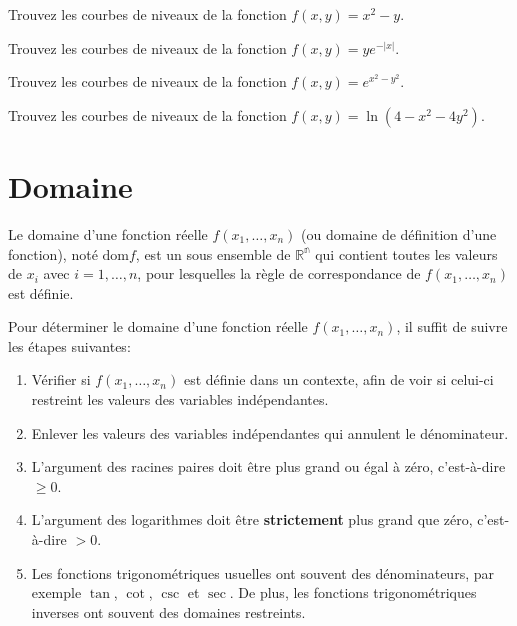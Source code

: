 \documentclass[]{book}
\providecommand{\tightlist}{%
  \setlength{\itemsep}{0pt}\setlength{\parskip}{0pt}}
\theoremstyle{definition}
\theoremstyle{definition}
\theoremstyle{definition}
\theoremstyle{remark}
\let\BeginKnitrBlock\begin \let\EndKnitrBlock\end
\begin{document}
\BeginKnitrBlock{example}
\protect\hypertarget{exm:unnamed-chunk-128}{}{\label{exm:unnamed-chunk-128}
}Trouvez les courbes de niveaux de la fonction \(f(x,y)=x^2-y\).
\EndKnitrBlock{example}
\vspace*{6cm}

\BeginKnitrBlock{example}
\protect\hypertarget{exm:unnamed-chunk-129}{}{\label{exm:unnamed-chunk-129}
}Trouvez les courbes de niveaux de la fonction \(f(x,y)=ye^{-|x|}\).
\EndKnitrBlock{example}
\vspace*{6cm}

\BeginKnitrBlock{example}
\protect\hypertarget{exm:unnamed-chunk-130}{}{\label{exm:unnamed-chunk-130}
}Trouvez les courbes de niveaux de la fonction \(f(x,y)=e^{x^2-y^2}\).
\EndKnitrBlock{example}
\vspace*{6cm}

\BeginKnitrBlock{example}
\protect\hypertarget{exm:unnamed-chunk-131}{}{\label{exm:unnamed-chunk-131}
}Trouvez les courbes de niveaux de la fonction
\(f(x,y)=\ln(4-x^2-4y^2)\).
\EndKnitrBlock{example}
\vspace*{6cm}

\hypertarget{domaine}{%
\section{Domaine}\label{domaine}}

\BeginKnitrBlock{definition}[Domaine d'une fonction]
\protect\hypertarget{def:unnamed-chunk-132}{}{\label{def:unnamed-chunk-132}
{} }Le domaine d'une fonction
réelle \(f(x_1,\ldots,x_n)\) (ou domaine de définition d'une fonction),
noté \(\text{dom} f\), est un sous ensemble de \(\mathbb{R^n}\) qui
contient toutes les valeurs de \(x_i\) avec \(i=1,\ldots, n\), pour
lesquelles la règle de correspondance de \(f(x_1,\ldots,x_n)\) est
définie.
\EndKnitrBlock{definition}

Pour déterminer le domaine d'une fonction réelle \(f(x_1,\ldots,x_n)\),
il suffit de suivre les étapes suivantes:

\begin{enumerate}
\def\labelenumi{\arabic{enumi}.}
\tightlist
\item
  Vérifier si \(f(x_1,\ldots,x_n)\) est définie dans un contexte, afin
  de voir si celui-ci restreint les valeurs des variables indépendantes.
\item
  Enlever les valeurs des variables indépendantes qui annulent le
  dénominateur.
\item
  L'argument des racines paires doit être plus grand ou égal à zéro,
  c'est-à-dire \(\geq 0\).
\item
  L'argument des logarithmes doit être \textbf{strictement} plus grand
  que zéro, c'est-à-dire \(> 0\).
\item
  Les fonctions trigonométriques usuelles ont souvent des dénominateurs,
  par exemple \(\tan\), \(\cot\), \(\csc\) et \(\sec\). De plus, les
  fonctions trigonométriques inverses ont souvent des domaines
  restreints.
\end{enumerate}
\end{document}
